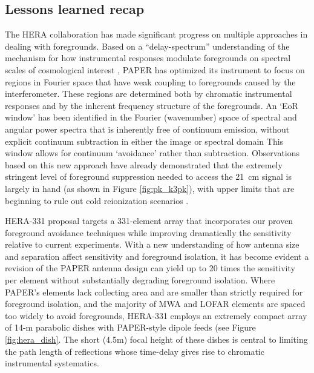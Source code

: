 \documentclass[preprint]{aastex}
\begin{document}
\subsection{Lessons learned recap} %
The HERA collaboration has made significant progress on multiple approaches in dealing with
foregrounds.
Based on a ``delay-spectrum'' understanding of
the mechanism for how instrumental responses modulate foregrounds on
spectral scales of cosmological interest \citep{parsons_et_al2012b},
PAPER has optimized its instrument to focus on regions in Fourier
space that have weak coupling to foregrounds caused by the
interferometer.  These regions are determined both by chromatic
instrumental responses and by the inherent frequency structure of the
foregrounds.  An `EoR window' has been identified in the Fourier
(wavenumber) space of spectral and angular power spectra that is
inherently free of continuum emission, without explicit continuum
subtraction in either the image or spectral domain \citep{pober_et_al2013,morales_et_al2012,Datta_2010}
This window allows for continuum
`avoidance' rather than subtraction. Observations based on this new
approach have already demonstrated that the extremely stringent level
of foreground suppression needed to access the 21~cm signal is largely
in hand (as shown in Figure \ref{fig:pk_k3pk}), with upper limits
that are beginning to rule out cold reionization scenarios \citep{parsons_et_al2013}.

HERA-331 proposal targets a 331-element array that incorporates
our proven foreground avoidance techniques while improving
dramatically the sensitivity relative to current experiments.  With a
new understanding of how antenna size and separation affect
sensitivity and foreground isolation, it has become evident a revision
of the PAPER antenna design can yield up to 20 times the sensitivity
per element without substantially degrading foreground isolation.
Where PAPER's elements lack collecting area and are smaller than
strictly required for foreground isolation, and the majority of MWA
and LOFAR elements are spaced too widely to avoid foregrounds,
HERA-331 employs an extremely compact array of 14-m parabolic dishes
with PAPER-style dipole feeds (see Figure \ref{fig:hera_dish}.  The
short (4.5m) focal height of these dishes is central to limiting the
path length of reflections whose time-delay gives rise to chromatic
instrumental systematics.
\end{document}
